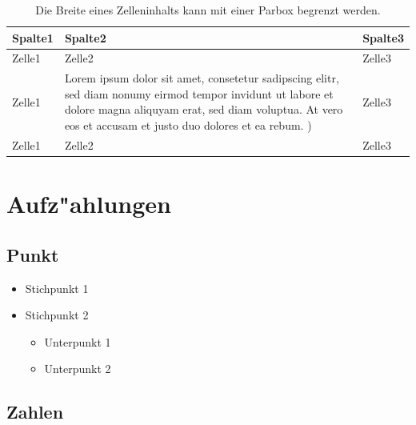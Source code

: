 \begin{table}[H]\centering
\begin{tabularx}{\textwidth}{l l l} 			
\parbox[t]{2.5cm}{\textbf{Spalte1}}	& \parbox[t]{9cm}{\textbf{Spalte2}}                                 			& \textbf{Spalte3}	\\\hline

\parbox[t]{2.5cm}{Zelle1}             		& \parbox[t]{9cm}{Zelle2}                                                 	&   Zelle3                 	\\ 

\parbox[t]{2.5cm}{Zelle1}    	   	    	& \parbox[t]{9cm}{Lorem ipsum dolor sit amet, consetetur sadipscing elitr, sed diam nonumy eirmod tempor invidunt ut labore et dolore magna aliquyam erat, sed diam voluptua. At vero eos et accusam et justo duo dolores et ea rebum. )}	& Zelle3        \\

\parbox[t]{2.5cm}{Zelle1}             		& \parbox[t]{9cm}{Zelle2}                                                 	&   Zelle3                 	\\ 

\end{tabularx}
\caption[ParBox in einer Tabelle]{Die Breite eines Zelleninhalts kann mit einer Parbox begrenzt werden.}
\label{tab:Tabelle4}
\end{table}



\section{Aufz"ahlungen}
\label{sec:Aufzaehlungen}

\subsection{Punkt}
\label{subsec:Punkt}

\begin{itemize}
\item Stichpunkt 1
\item Stichpunkt 2
\begin{itemize}
\item Unterpunkt 1
\item Unterpunkt 2
\end{itemize}
\end{itemize}

\subsection{Zahlen}
\label{subsec:Zahlen}

